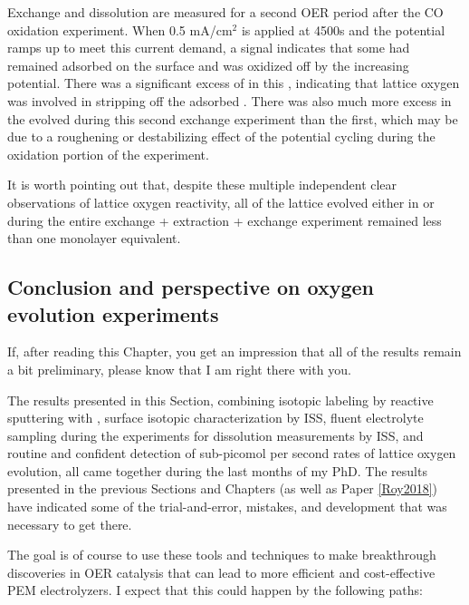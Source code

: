 Exchange and dissolution are measured for a second OER period after the CO oxidation experiment. When 0.5 mA/cm$^2$ is applied at 4500s and the potential ramps up to meet this current demand, a  signal indicates that some  had remained adsorbed on the surface and was oxidized off by the increasing potential. There was a significant excess of  in this , indicating that lattice oxygen was involved in stripping off the adsorbed . There was also much more excess  in the  evolved during this second exchange experiment than the first, which may be due to a roughening or destabilizing effect of the potential cycling during the  oxidation portion of the experiment. 

It is worth pointing out that, despite these multiple independent clear observations of lattice oxygen reactivity, all of the lattice   evolved either in  or  during the entire exchange + extraction + exchange experiment remained less than one monolayer equivalent.


\subsection{Conclusion and perspective on oxygen evolution experiments}

If, after reading this Chapter, you get an impression that all of the results remain a bit preliminary, please know that I am right there with you. 

The results presented in this Section, combining isotopic labeling by reactive sputtering with , surface isotopic characterization by ISS, fluent electrolyte sampling during the experiments for dissolution measurements by ISS, and routine and confident detection of sub-picomol per second rates of lattice oxygen evolution, all came together during the last months of my PhD. The results presented in the previous Sections and Chapters (as well as Paper \ref{Roy2018}) have indicated some of the trial-and-error, mistakes, and development that was necessary to get there.

The goal is of course to use these tools and techniques to make breakthrough discoveries in OER catalysis that can lead to more efficient and cost-effective PEM electrolyzers. I expect that this could happen by the following paths:

